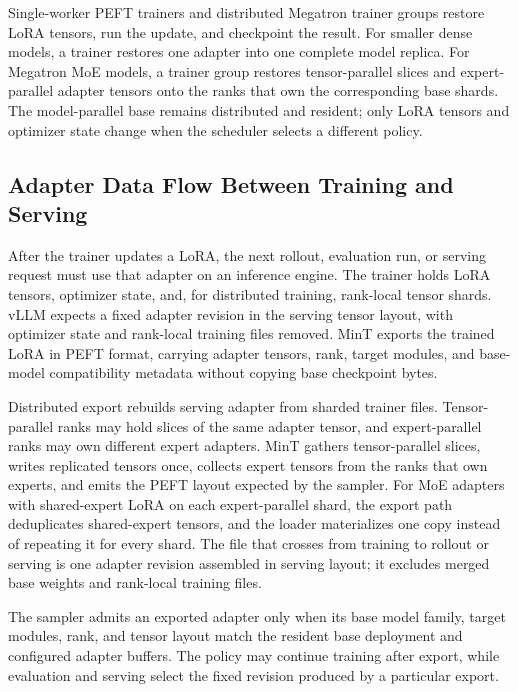 \documentclass{llmxive}
\begin{document}
Single-worker PEFT trainers and distributed Megatron trainer groups restore LoRA tensors, run the update, and checkpoint the result. For smaller dense models, a trainer restores one adapter into one complete model replica. For Megatron MoE models, a trainer group restores tensor-parallel slices and expert-parallel adapter tensors onto the ranks that own the corresponding base shards. The model-parallel base remains distributed and resident; only LoRA tensors and optimizer state change when the scheduler selects a different policy.

\subsection{Adapter Data Flow Between Training and Serving}

After the trainer updates a LoRA, the next rollout, evaluation run, or serving request must use that adapter on an inference engine. The trainer holds LoRA tensors, optimizer state, and, for distributed training, rank-local tensor shards. vLLM expects a fixed adapter revision in the serving tensor layout, with optimizer state and rank-local training files removed. MinT exports the trained LoRA in PEFT format, carrying adapter tensors, rank, target modules, and base-model compatibility metadata without copying base checkpoint bytes.

Distributed export rebuilds serving adapter from sharded trainer files. Tensor-parallel ranks may hold slices of the same adapter tensor, and expert-parallel ranks may own different expert adapters. MinT gathers tensor-parallel slices, writes replicated tensors once, collects expert tensors from the ranks that own experts, and emits the PEFT layout expected by the sampler. For MoE adapters with shared-expert LoRA on each expert-parallel shard, the export path deduplicates shared-expert tensors, and the loader materializes one copy instead of repeating it for every shard. The file that crosses from training to rollout or serving is one adapter revision assembled in serving layout; it excludes merged base weights and rank-local training files.

The sampler admits an exported adapter only when its base model family, target modules, rank, and tensor layout match the resident base deployment and configured adapter buffers. The policy may continue training after export, while evaluation and serving select the fixed revision produced by a particular export.
\end{document}
